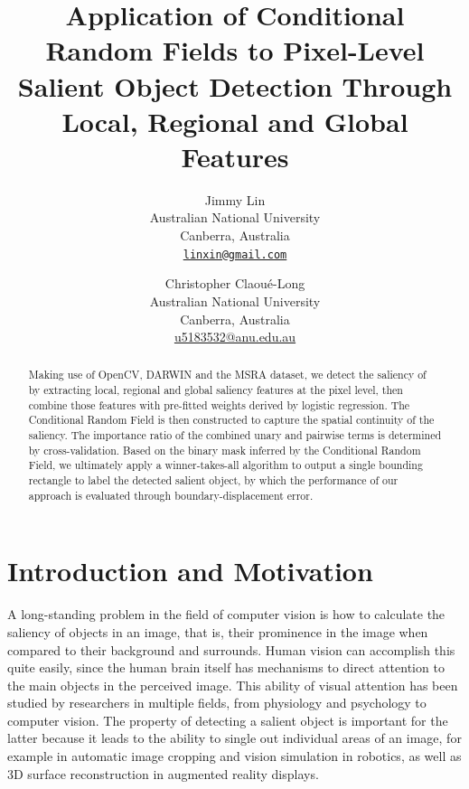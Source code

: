 \documentclass[10pt,twocolumn,letterpaper]{article}
\begin{document}
\title{Application of Conditional Random Fields to Pixel-Level Salient Object Detection Through Local, Regional and Global Features}

\author{Jimmy Lin\\
Australian National University\\
Canberra, Australia\\
{\tt\small \url{linxin@gmail.com}}
\and
Christopher Claou\'e-Long\\
Australian National University\\
Canberra, Australia\\
{\small\url{u5183532@anu.edu.au}}
}

\maketitle

\begin{abstract}
Making use of OpenCV, DARWIN and the MSRA dataset, we detect the saliency of by extracting local, regional and global saliency features at the pixel level, then combine those features with pre-fitted weights derived by logistic regression. The Conditional Random Field is then constructed to capture the spatial continuity of the saliency. The importance ratio of the combined unary and pairwise terms is determined by cross-validation. Based on the binary mask inferred by the Conditional Random Field, we ultimately apply a winner-takes-all algorithm to output a single bounding rectangle to label the detected salient object, by which the performance of our approach is evaluated through boundary-displacement error. 
\end{abstract}

\section{Introduction and Motivation}

A long-standing problem in the field of computer vision is how to calculate the saliency of objects in an image, that is, their prominence in the image when compared to their background and surrounds.  Human vision can accomplish this quite easily, since the human brain itself has mechanisms to direct attention to the main objects in the perceived image.  This ability of visual attention has been studied by researchers in multiple fields, from physiology and psychology to computer vision.  The property of detecting a salient object is important for the latter because it leads to the ability to single out individual areas of an image, for example in automatic image cropping and vision simulation in robotics, as well as 3D surface reconstruction in augmented reality displays.
\end{document}
